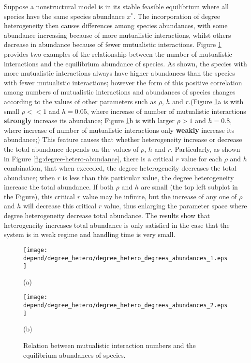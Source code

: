 \documentclass[a4paper,fleqn,12pt]{article}
\begin{document}
Suppose a nonstructural model is in its stable feasible equilibrium where all species have the same species abundance $x^*$.
The incorporation of degree heterogeneity then causes differences among species abundances, with some abundance increasing because of more mutualistic interactions, whilst others decrease in abundance because of fewer mutualistic interactions.
Figure \ref{fig:degree-hetero-degrees-abundances} provides two examples of the relationship between the number of mutualistic interactions and the equilibrium abundance of species.
As shown, the species with more mutualistic interactions always have higher abundances than the species with fewer mutualistic interactions;
however the form of this positive correlation among numbers of mutualistic interactions and abundances of species changes according to the values of other parameters such as $\rho$, $h$ and $r$.(Figure \ref{fig:degree-hetero-degrees-abundances}a is with small $\rho<<1$ and $h=0.05$, where increase of number of mutualistic interactions \textbf{strongly} increase its abundance; Figure \ref{fig:degree-hetero-degrees-abundances}b is with larger $\rho>1$ and $h=0.8$, where increase of number of mutualistic interactions only \textbf{weakly} increase its abundance;)
This feature causes that whether heterogeneity increase or decrease the total abundance depends on the values of $\rho$, $h$ and $r$.
Particularly, as shown in Figure \ref{fig:degree-hetero-abundance}, there is a critical $r$ value for each $\rho$ and $h$ combination, that when exceeded, the degree heterogeneity decreases the total abundance; when $r$ is less than this particular value, the degree heterogeneity increase the total abundance.
If both $\rho$ and $h$ are small (the top left subplot in the Figure),
this critical $r$ value may be infinite,
but the increase of any one of $\rho$ and $h$ will decrease this critical $r$ value, thus enlarging the parameter space where degree heterogeneity decrease total abundance.
The results show that heterogeneity increases total abundance\cite{suweis_emergence_2013} is only satisfied in the case that the system is in weak regime and handling time is very small.

\begin{figure}[htbp]
\begin{minipage}{0.4\linewidth}
  \texttt{[image: depend/degree\_hetero/degree\_hetero\_degrees\_abundances\_1.eps]}
  {\centering(a) \par}
\end{minipage}
\hfill
\begin{minipage}{0.4\linewidth}
  \texttt{[image: depend/degree\_hetero/degree\_hetero\_degrees\_abundances\_2.eps]}
  {\centering(b) \par}
\end{minipage}
\caption{Relation between mutualistic interaction numbers and the equilibrium abundances of species.}
\label{fig:degree-hetero-degrees-abundances}
\end{figure}
\end{document}
